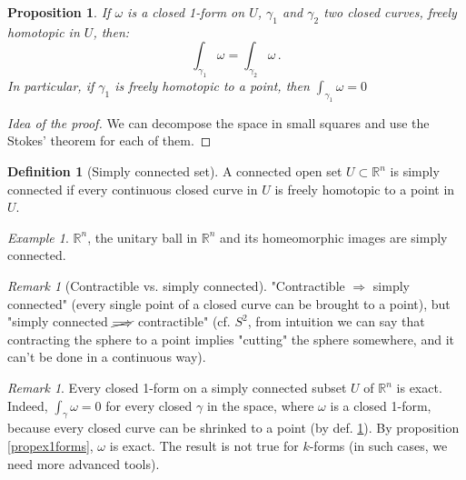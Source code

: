 \documentclass[a4paper,11pt,titlepage, article, oneside]{memoir}
\numberwithin{equation}{section}
\newtheorem{proposition}[theorem]{Proposition}
\theoremstyle{definition}
\newtheorem{definition}[theorem]{Definition}
\theoremstyle{remark}
\newtheorem{remark}[theorem]{Remark}
\newtheorem{example}[theorem]{Example}
\newcommand{\rfield}{\mathbb{R}}
\begin{document}
\begin{proposition}
  If $\omega$ is a closed 1-form on $U$, $\gamma_1$ and $\gamma_2$ two closed curves, freely homotopic in $U$, then:
  \begin{equation}
    \int_{\gamma_1} \omega = \int_{\gamma_2} \omega \, .
  \end{equation}
  In particular, if $\gamma_1$ is freely homotopic to a point, then $\int_{\gamma_1} \omega = 0$
\end{proposition}
\begin{proof}[Idea of the proof]
We can decompose the space in small squares and use the Stokes' theorem for each of them.
\end{proof}

\begin{definition}[Simply connected set] \label{closedinsimplyconn}
  A connected open set $U \subset \rfield^n$ is simply connected if every continuous closed curve in $U$ is freely homotopic to a point in $U$.
\end{definition}

\begin{tcolorbox}\begin{example}
  $\rfield^n$, the unitary ball in $\rfield^n$ and its homeomorphic images are simply connected.
\end{example}\end{tcolorbox}

\begin{remarkbox}\begin{remark}[Contractible vs. simply connected]
"Contractible $\Longrightarrow$ simply connected" (every single point of a closed curve can be brought to a point), but "simply connected $\cancel{\Longrightarrow}$ contractible" (cf. $S^2$, from intuition we can say that contracting the sphere to a point implies "cutting" the sphere somewhere, and it can't be done in a continuous way).
\end{remark}\end{remarkbox}

\begin{remarkbox}\begin{remark}
  Every closed 1-form on a simply connected subset $U$ of $\rfield^n$ is exact. Indeed, $\int_{\gamma} \omega = 0$ for every closed $\gamma$ in the space, where $\omega$ is a closed 1-form, because every closed curve can be shrinked to a point (by def. \ref{closedinsimplyconn}). By proposition \ref{propex1forms}, $\omega$ is exact. The result is not true for $k$-forms (in such cases, we need more advanced tools).
\end{remark}\end{remarkbox}
\end{document}
